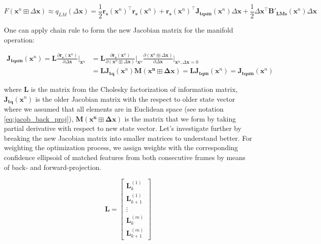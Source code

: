 \documentclass[12pt]{report}
\numberwithin{figure}{section}
\begin{document}
\begin{appendices}
\begin{equation}
  F(\mathbf{x}^n \boxplus \Delta \mathbf{x}) \approx 
  q_{LM} (\Delta \mathbf{x}) = 
  \frac{1}{2}
\mathbf{r_s}(\mathbf{x}^n)^\top\mathbf{r_s}(\mathbf{x}^n) + 
\mathbf{r_s}(\mathbf{x}^n)^\top\mathbf{J_{tqsm}}(\mathbf{x}^n)\Delta 
\mathbf{x} + 
\frac{1}{2} \Delta \mathbf{x}^\top\mathbf{B'_{LMs}}(\mathbf{x}^n)\Delta 
\mathbf{x}
\end{equation}

One can apply chain rule to form the new Jacobian matrix for the manifold operation:

\begin{equation}
  \begin{aligned}
  \mathbf{J_{tqsm}}(\mathbf{x}^n) = 
  \mathbf{L} \frac{\partial \mathbf{r_s}(\mathbf{x}^n)}
  {\partial \Delta \mathbf{x}} \bigg|_{\mathbf{x}^n} & = 
  \mathbf{L} \frac{\partial \mathbf{r_s}(\mathbf{x}^n)}
{\partial (\mathbf{x}^n \boxplus \Delta \mathbf{x})} \bigg|_{\mathbf{x}^n}
  \frac{\partial (\mathbf{x}^n \boxplus \Delta \mathbf{x})}
  {\partial \Delta \mathbf{x}} \bigg|_{\mathbf{x}^n,\Delta \mathbf{x}=0} \\
  & = 
  \mathbf{L}\mathbf{J_{tq}}(\mathbf{x}^n) 
  \mathbf{M}(\mathbf{\mathbf{x}^n \boxplus \Delta \mathbf{x}})
  = 
  \mathbf{L}\mathbf{J_{tqm}}(\mathbf{x}^n)
  = 
  \mathbf{J_{tqsm}}(\mathbf{x}^n)
\end{aligned}
\end{equation}\label{eq:new_jacobian_chain_rule}

where $\mathbf{L}$ is the matrix from the Cholesky factorization of information matrix, 
$\mathbf{J_{tq}}(\mathbf{x}^n)$ is the older Jacobian matrix with the respect 
to 
older state vector where we assumed that all elements are in Euclidean space 
(see notation \eqref{eq:jacob_back_proj}), 
$\mathbf{M}(\mathbf{\mathbf{x}^n \boxplus \Delta \mathbf{x}})$ is the 
matrix that we form by taking partial derivative with respect to new state vector.
Let's investigate further by breaking the new Jacobian matrix into smaller matrices 
to understand better. For weighting the optimization process, 
we assign weights with the corresponding confidence ellipsoid of matched 
features 
from both consecutive frames by means of back- and forward-projection.

\begin{equation}
  \mathbf{L} 
  =
  \begin{bmatrix}
    \mathbf{L}^{(1)}_{k} \\
    \mathbf{L}^{(1)}_{k+1} \\
    \vdots \\
    \mathbf{L}^{(m)}_{k} \\
    \mathbf{L}^{(m)}_{k+1}
  \end{bmatrix}
\end{equation}


\end{appendices}
\end{document}
